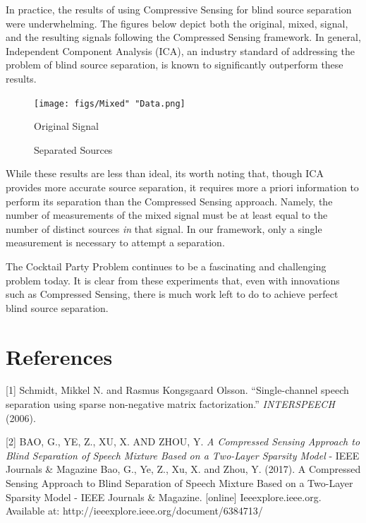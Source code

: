 \documentclass{article}
\begin{document}
In practice, the results of using Compressive Sensing for blind source separation were underwhelming. The figures below depict both the original, mixed, signal, and the resulting signals following the Compressed Sensing framework. In general, Independent Component Analysis (ICA), an industry standard of addressing the problem of blind source separation, is known to significantly outperform these results.

\begin{figure}[H]
  \centering
  \texttt{[image: figs/Mixed" "Data.png]}
  \caption{Original Signal}
\end{figure}

\begin{figure}[H]
  \centering
  \caption{Separated Sources}
\end{figure}

While these results are less than ideal, its worth noting that, though ICA provides more accurate source separation, it requires more a priori information to perform its separation than the Compressed Sensing approach. Namely, the number of measurements of the mixed signal must be at least equal to the number of distinct sources \textit{in} that signal. In our framework, only a single measurement is necessary to attempt a separation.

The Cocktail Party Problem continues to be a fascinating and challenging problem today. It is clear from these experiments that, even with innovations such as Compressed Sensing, there is much work left to do to achieve perfect blind source separation.


\section*{References}

\medskip

\small

[1] Schmidt, Mikkel N. and Rasmus Kongsgaard Olsson. “Single-channel speech separation using sparse non-negative matrix factorization.” {\it INTERSPEECH} (2006).

[2] BAO, G., YE, Z., XU, X. AND ZHOU, Y.
{\it A Compressed Sensing Approach to Blind Separation of Speech Mixture Based on a Two-Layer Sparsity Model} - IEEE Journals \& Magazine Bao, G., Ye, Z., Xu, X. and Zhou, Y. (2017). A Compressed Sensing Approach to Blind Separation of Speech Mixture Based on a Two-Layer Sparsity Model - IEEE Journals \& Magazine. [online] Ieeexplore.ieee.org. Available at: http://ieeexplore.ieee.org/document/6384713/
\end{document}
